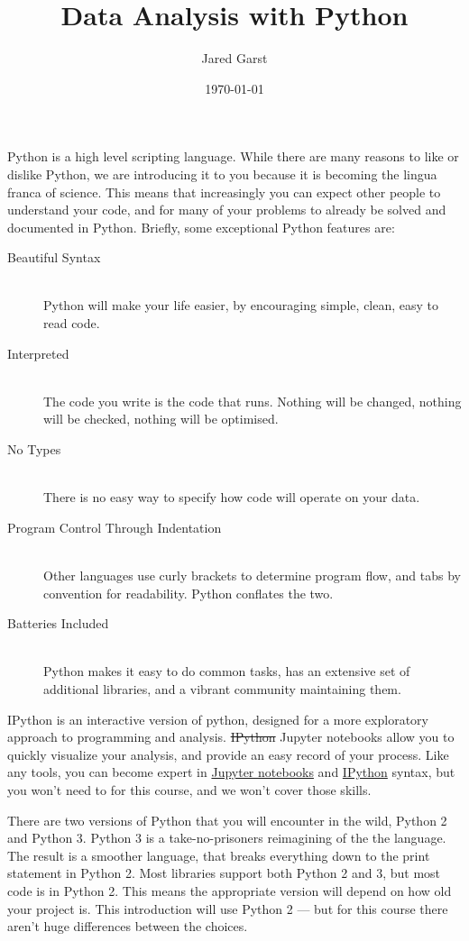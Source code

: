 \documentclass[justified, nobib]{tufte-handout}
\title{Data Analysis with Python}
\author{Jared Garst}
\date{\today} %
\newcommand{\ipythonTutorialLink}
  {http://ipython.readthedocs.org/en/stable/interactive/index.html}
\newcommand{\jupyterInfoLink}
  {http://jupyter-notebook.readthedocs.org/en/latest/notebook.html\#basic-workflow}
\begin{document}
\maketitle
\bigskip

\noindent
Python is a high level scripting language. While there are many reasons to like
or dislike Python, we are introducing it to you because it is becoming the
lingua franca of science.
This means that increasingly you can expect other people to understand
your code, and for many of your problems to already be solved and documented in
Python. Briefly, some exceptional Python features are:

\begin{description}
\item[Beautiful Syntax] \hfill \\
  Python will make your life easier, by encouraging simple, clean, easy to read
  code.
\item[Interpreted] \hfill \\
  The code you write is the code that runs. Nothing will be changed, nothing
  will be checked, nothing will be optimised.
\item[No Types] \hfill \\
  There is no easy way to specify how code will operate on your data.
\item[Program Control Through Indentation] \hfill \\
  Other languages use curly brackets \ipythoninline{{}} to determine program
  flow, and tabs by convention for readability.
  Python conflates the two.
\item[Batteries Included] \hfill \\
  Python makes it easy to do common tasks, has an extensive set of additional
  libraries, and a vibrant community maintaining them.
\end{description}

\noindent
IPython is an interactive version of python, designed for a more exploratory
approach to programming and analysis.
\sout{IPython} Jupyter notebooks allow you to quickly visualize your analysis,
and provide an easy record of your process.
Like any tools, you can become expert in
\href{\jupyterInfoLink}{Jupyter notebooks} and
\href{\ipythonTutorialLink}{IPython} syntax, but you won't need to for this
course, and we won't cover those skills.

\smallskip
\noindent
There are two versions of Python that you will encounter in the wild, Python 2
and Python 3. Python 3 is a take-no-prisoners reimagining of the the
language.
The result is a smoother language, that breaks everything down to the print
statement in Python 2.
Most libraries support both Python 2 and 3, but most code is in Python 2.
This means the appropriate version will depend on how old your project is.
This introduction will use Python 2 --- but for this course there aren't huge
differences between the choices.
\end{document}
